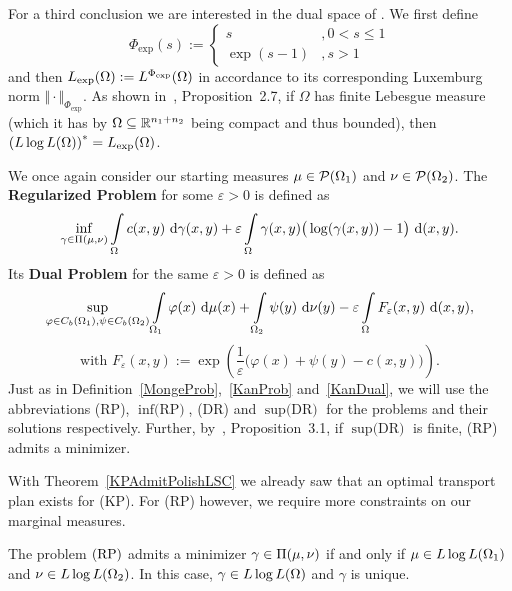 For a third conclusion we are interested in the dual space of \LLL{}. We first define
\[ \Phi_{\exp}(s) := \begin{cases}
	s & , 0 < s \le 1 \\
	\exp(s - 1) & , s > 1
\end{cases} \]
and then $\Lexp := \Orlicz{\Phi_{\exp}}$ in accordance to its corresponding Luxemburg norm $\Vert \cdot \Vert_{\Phi_{\exp}}$. As shown in~\cite{Cla2021}, Proposition~2.7, if $\Omega$ has finite Lebesgue measure (which it has by $\Omega \subseteq \R^{n_1 + n_2}$ being compact and thus bounded), then ${(\LLL)}^* = \Lexp$.

\begin{definition}\label{RegProbs}
	We once again consider our starting measures $\mu \in \PM{\Omega_1}$ and $\nu \in \PM{\Omega_2}$. The \textbf{Regularized Problem} for some $\varepsilon > 0$ is defined as
	\[ \inf\limits_{\gamma \in \TP{\mu}{\nu}} \int\limits_\Omega c(x, y)~\Dx[x, y]{\gamma} + \varepsilon \int\limits_\Omega \gamma(x, y) \big( \log(\gamma(x, y)) - 1 \big)~\Dx[x, y]{}. \]
	Its \textbf{Dual Problem} for the same $\varepsilon > 0$ is defined as
	\[ \sup\limits_{\varphi \in \CF[b]{\Omega_1}, \psi \in \CF[b]{\Omega_2}} \int\limits_{\Omega_1} \varphi(x)~\Dx{\mu} + \int\limits_{\Omega_2} \psi(y)~\Dx[y]{\nu} - \varepsilon \int\limits_\Omega F_{\varepsilon}(x, y)~\Dx[x, y]{}, \]
	\[ \text{with } F_{\varepsilon}(x, y) := \exp\left( \frac{1}{\varepsilon} \big( \varphi(x) + \psi(y) - c(x, y) \big) \right). \]
	Just as in Definition~\ref{MongeProb},~\ref{KanProb} and~\ref{KanDual}, we will use the abbreviations (RP), $\inf \text{(RP)}$, (DR) and $\sup \text{(DR)}$ for the problems and their solutions respectively. Further, by~\cite{Cla2021}, Proposition~3.1, if $\sup \text{(DR)}$ is finite, (RP) admits a minimizer.
\end{definition}

With Theorem~\ref{KPAdmitPolishLSC} we already saw that an optimal transport plan exists for (KP). For (RP) however, we require more constraints on our marginal measures.

\begin{theorem}\label{RegProbAdmitLLL}
	The problem$\text{\normalfont\ (RP)}$ admits a minimizer $\gamma \in \TP{\mu}{\nu}$ if and only if $\mu \in \LLL[\Omega_1]$ and $\nu \in \LLL[\Omega_2]$. In this case, $\gamma \in \LLL$ and $\gamma$ is unique.
\end{theorem}

